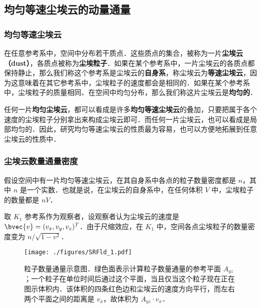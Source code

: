 


\subsection{均匀等速尘埃云的动量通量}

\subsubsection{均匀等速尘埃云}

在任意参考系中，空间中分布若干质点．这些质点的集合，被称为一片\textbf{尘埃云（dust）}，各质点被称为\textbf{尘埃粒子}．如果在某个参考系中，一片尘埃云的各质点都保持静止，那么我们称这个参考系是尘埃云的\textbf{自身系}，称尘埃云为\textbf{等速尘埃云}，因为这意味着在其它参考系中，尘埃粒子的速度都会是相同的．如果在某个参考系中，尘埃粒子的质量相同、在空间中均匀分布，那么我们称这片尘埃云是\textbf{均匀的}．

任何一片\textbf{均匀尘埃云}，都可以看成是许多\textbf{均匀等速尘埃云}的叠加，只要把属于各个速度的尘埃粒子分别拿出来构成尘埃云即可．而任何一片尘埃云，也可以看成是局部均匀的．因此，研究均匀等速尘埃云的性质最为容易，也可以方便地拓展到任意尘埃云的性质中．

\subsubsection{尘埃云数量通量密度}

假设空间中有一片均匀等速尘埃云，在其自身系中各点的粒子数量密度都是 $n$，其中 $n$ 是一个实数．也就是说，在尘埃云的自身系中，在任何体积 $V$ 中，尘埃粒子的数量都是 $nV$．

取 $K_1$ 参考系作为观察者，设观察者认为尘埃云的速度是 $\bvec{v}=(v_x, v_y, v_z)^T$．由于尺缩效应，在 $K_1$ 中，空间各点尘埃粒子的数量密度变为 $n/\sqrt{1-v^2}$．

\begin{figure}[ht]
\centering
\texttt{[image: ./figures/SRFld\_1.pdf]}
\caption{粒子数量通量示意图．绿色面表示计算粒子数量通量的参考平面 $A_{yz}$；一个粒子在单位时间后通过这个平面，当且仅当这个粒子现在正在图示体积内．该体积的四条红色边和尘埃云的速度方向平行，而左右两个平面之间的距离是 $v_x$，故体积为 $A_{yz}\cdot v_x$．} \label{SRFld_fig1}
\end{figure}

